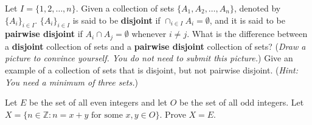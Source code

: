 \documentclass{article}
\newcommand{\Z}{\mathbb{Z}}
\theoremstyle{definition}
\begin{document}
\begin{question}
   Let $I=\{1, 2, \dots, n\}$. Given a collection of sets $\{A_1,A_2,\dots, A_n\}$, denoted by $\{A_i\}_{i\in I}$. $\{A_i\}_{i\in I}$ is said to be \textbf{disjoint} if $\cap_{i\in I}A_i=\emptyset$, and it is said to be \textbf{pairwise disjoint} if $A_i\cap A_j=\emptyset$ whenever $i\neq j$. What is the difference between a \textbf{disjoint} collection of sets and a \textbf{pairwise disjoint} collection of sets? (\textit{Draw a picture to convince yourself. You do not need to submit this picture.}) Give an example of a collection of sets that is disjoint, but not pairwise disjoint. (\textit{Hint: You need a minimum of three sets.})
\end{question}
\begin{solution}
\end{solution}


\begin{question}
   Let $E$ be the set of all even integers and let $O$ be the set of all odd integers. Let $X=\{ n\in \Z : n = x+y \text{ for some } x, y\in O\}$. Prove $X=E$.
\end{question}
\begin{solution}
\end{solution}
\end{document}
